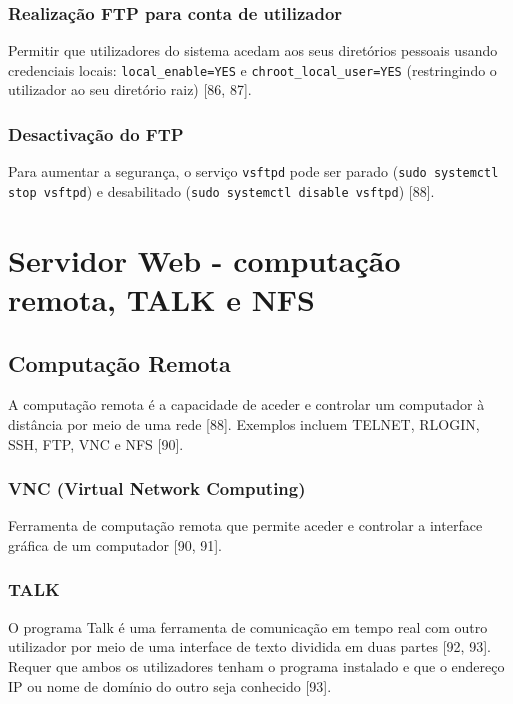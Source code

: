 \documentclass[12pt, a4paper]{article}
\begin{document}
	\subsection{Realização FTP para conta de utilizador} %
	Permitir que utilizadores do sistema acedam aos seus diretórios pessoais usando credenciais locais: \texttt{local\_enable=YES} e \texttt{chroot\_local\_user=YES} (restringindo o utilizador ao seu diretório raiz) [86, 87].
	
	\subsection{Desactivação do FTP} %
	Para aumentar a segurança, o serviço \texttt{vsftpd} pode ser parado (\texttt{sudo systemctl stop vsftpd}) e desabilitado (\texttt{sudo systemctl disable vsftpd}) [88].
	
	\newpage
	
	\chapter{Servidor Web - computação remota, TALK e NFS} %
	
	\section{Computação Remota} %
	A computação remota é a capacidade de aceder e controlar um computador à distância por meio de uma rede [88]. Exemplos incluem TELNET, RLOGIN, SSH, FTP, VNC e NFS [90].
	
	\subsection{VNC (Virtual Network Computing)} %
	Ferramenta de computação remota que permite aceder e controlar a interface gráfica de um computador [90, 91].
	
	\subsection{TALK} %
	O programa Talk é uma ferramenta de comunicação em tempo real com outro utilizador por meio de uma interface de texto dividida em duas partes [92, 93]. Requer que ambos os utilizadores tenham o programa instalado e que o endereço IP ou nome de domínio do outro seja conhecido [93].
	
\end{document}
